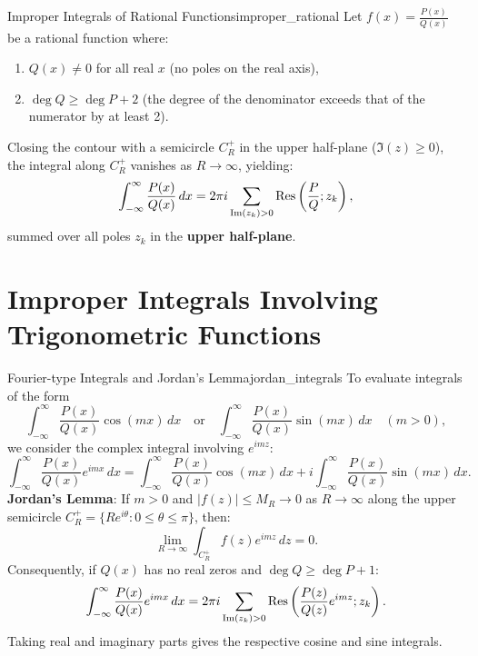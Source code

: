 \begin{theorem}{Improper Integrals of Rational Functions}{improper_rational}
Let $f(x) = \frac{P(x)}{Q(x)}$ be a rational function where:
\begin{enumerate}
    \item $Q(x) \neq 0$ for all real $x$ (no poles on the real axis),
    \item $\deg Q \ge \deg P + 2$ (the degree of the denominator exceeds that of the numerator by at least 2).
\end{enumerate}
Closing the contour with a semicircle $C_R^+$ in the upper half-plane ($\Im(z) \ge 0$), the integral along $C_R^+$ vanishes as $R \to \infty$, yielding:
\begin{equation}
\int_{-\infty}^\infty \frac{P(x)}{Q(x)}\, dx = 2\pi i \sum_{\operatorname{Im}(z_k) > 0} \operatorname{Res}\left(\frac{P}{Q}; z_k\right),
\end{equation}
summed over all poles $z_k$ in the \textbf{upper half-plane}.
\end{theorem}


\section{Improper Integrals Involving Trigonometric Functions}

\begin{theorem}{Fourier-type Integrals and Jordan's Lemma}{jordan_integrals}
To evaluate integrals of the form
\begin{equation}
\int_{-\infty}^\infty \frac{P(x)}{Q(x)} \cos(mx)\, dx \quad \text{or} \quad \int_{-\infty}^\infty \frac{P(x)}{Q(x)} \sin(mx)\, dx \quad (m > 0),
\end{equation}
we consider the complex integral involving $e^{imz}$:
\begin{equation}
\int_{-\infty}^\infty \frac{P(x)}{Q(x)} e^{imx}\, dx = \int_{-\infty}^\infty \frac{P(x)}{Q(x)} \cos(mx)\, dx + i \int_{-\infty}^\infty \frac{P(x)}{Q(x)} \sin(mx)\, dx.
\end{equation}
\textbf{Jordan's Lemma}: If $m > 0$ and $|f(z)| \le M_R \to 0$ as $R \to \infty$ along the upper semicircle $C_R^+ = \{R e^{i\theta} : 0 \le \theta \le \pi\}$, then:
\begin{equation}
\lim_{R \to \infty} \int_{C_R^+} f(z) e^{imz}\, dz = 0.
\end{equation}
Consequently, if $Q(x)$ has no real zeros and $\deg Q \ge \deg P + 1$:
\begin{equation}
\int_{-\infty}^\infty \frac{P(x)}{Q(x)} e^{imx}\, dx = 2\pi i \sum_{\operatorname{Im}(z_k) > 0} \operatorname{Res}\left(\frac{P(z)}{Q(z)} e^{imz}; z_k\right).
\end{equation}
Taking real and imaginary parts gives the respective cosine and sine integrals.
\end{theorem}


